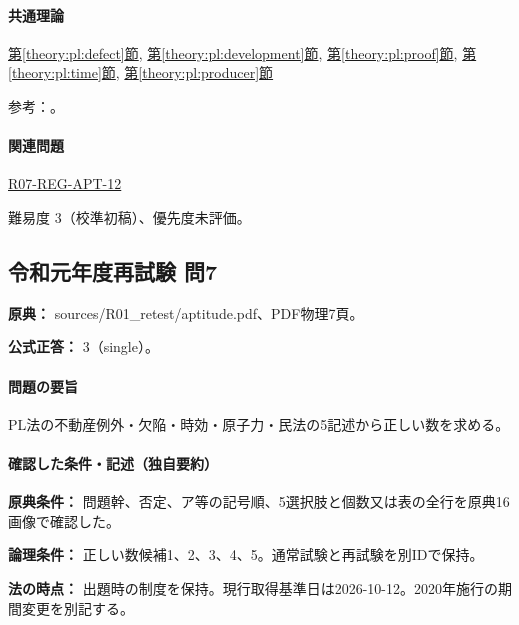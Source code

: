 \paragraph{共通理論} \hyperref[theory:pl:defect]{第\ref*{theory:pl:defect}節}, \hyperref[theory:pl:development]{第\ref*{theory:pl:development}節}, \hyperref[theory:pl:proof]{第\ref*{theory:pl:proof}節}, \hyperref[theory:pl:time]{第\ref*{theory:pl:time}節}, \hyperref[theory:pl:producer]{第\ref*{theory:pl:producer}節}

\par 参考：\cite{pl_statute,pl_qa,pl_transition2020}。

\paragraph{関連問題} \hyperref[q:r07-reg-apt-12]{R07-REG-APT-12}

\par 難易度 3（校準初稿）、優先度未評価。

\subsection{令和元年度再試験 問7}
\label{q:r01-ret-apt-07}

\noindent\textbf{原典：} sources/R01\_retest/aptitude.pdf、PDF物理7頁。

\textbf{公式正答：} 3（single）。

\paragraph{問題の要旨} PL法の不動産例外・欠陥・時効・原子力・民法の5記述から正しい数を求める。

\paragraph{確認した条件・記述（独自要約）}\mbox{}\par

\noindent\textbf{原典条件：} 問題幹、否定、ア等の記号順、5選択肢と個数又は表の全行を原典16画像で確認した。\par

\noindent\textbf{論理条件：} 正しい数候補1、2、3、4、5。通常試験と再試験を別IDで保持。\par

\noindent\textbf{法の時点：} 出題時の制度を保持。現行取得基準日は2026-10-12。2020年施行の期間変更を別記する。\par

